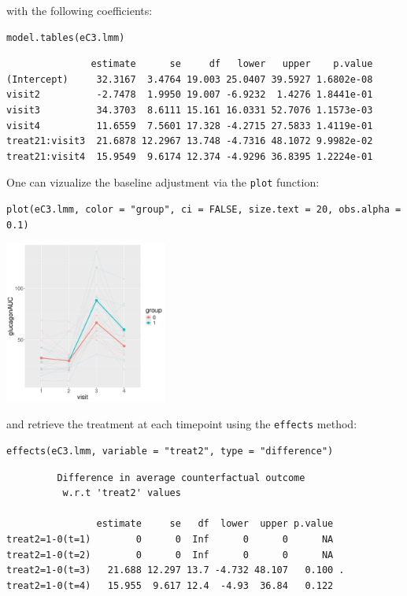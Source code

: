 \documentclass[12pt]{article}
\begin{document}
with the following coefficients:
\lstset{language=r,label= ,caption= ,captionpos=b,numbers=none}
\begin{lstlisting}
model.tables(eC3.lmm)
\end{lstlisting}

\begin{verbatim}
               estimate      se     df   lower   upper    p.value
(Intercept)     32.3167  3.4764 19.003 25.0407 39.5927 1.6802e-08
visit2          -2.7478  1.9950 19.007 -6.9232  1.4276 1.8441e-01
visit3          34.3703  8.6111 15.161 16.0331 52.7076 1.1573e-03
visit4          11.6559  7.5601 17.328 -4.2715 27.5833 1.4119e-01
treat21:visit3  21.6878 12.2967 13.748 -4.7316 48.1072 9.9982e-02
treat21:visit4  15.9549  9.6174 12.374 -4.9296 36.8395 1.2224e-01
\end{verbatim}


One can vizualize the baseline adjustment via the \texttt{plot} function:
\lstset{language=r,label= ,caption= ,captionpos=b,numbers=none}
\begin{lstlisting}
plot(eC3.lmm, color = "group", ci = FALSE, size.text = 20, obs.alpha = 0.1)
\end{lstlisting}

\begin{center}
\includegraphics[width=0.4\textwidth]{./figures/gg-baseAdj.pdf}
\end{center}

and retrieve the treatment at each timepoint using the \texttt{effects} method:
\lstset{language=r,label= ,caption= ,captionpos=b,numbers=none}
\begin{lstlisting}
effects(eC3.lmm, variable = "treat2", type = "difference")
\end{lstlisting}

\begin{verbatim}
	     Difference in average counterfactual outcome
	      w.r.t 'treat2' values 

                estimate     se   df  lower  upper p.value  
treat2=1-0(t=1)        0      0  Inf      0      0      NA  
treat2=1-0(t=2)        0      0  Inf      0      0      NA  
treat2=1-0(t=3)   21.688 12.297 13.7 -4.732 48.107   0.100 .
treat2=1-0(t=4)   15.955  9.617 12.4  -4.93  36.84   0.122
\end{verbatim}
\end{document}
